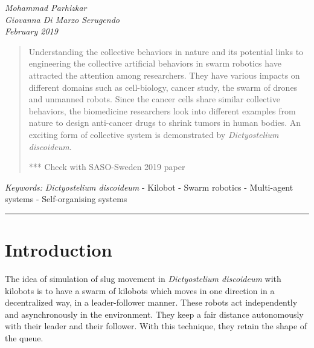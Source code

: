 \documentclass[11pt,a4paper]{article}
\begin{document}
\begin{center}
{ }
\vspace{2mm}

{\selectfont\textit{Mohammad Parhizkar \\ Giovanna Di Marzo Serugendo \\ \tiny{February 2019} }}


\end{center}
\begin{abstract}
Understanding the collective behaviors in nature and its potential links to engineering the collective artificial behaviors in swarm robotics have attracted the attention among researchers. They have various impacts on different domains such as cell-biology, cancer study, the swarm of drones and unmanned robots. Since the cancer cells share similar collective behaviors, the biomedicine researchers look into different examples from nature to design anti-cancer drugs to shrink tumors in human bodies. An exciting form of collective system is demonstrated by {\textit{Dictyostelium discoideum}}. 

*** Check with SASO-Sweden 2019 paper

   \end{abstract}

{\footnotesize\textit{Keywords:} {\textit{Dictyostelium discoideum}} - Kilobot - Swarm robotics - Multi-agent systems - Self-organising systems}

{\begin{center}\noindent\rule{14cm}{0.4pt}\end{center}}
\section{Introduction}
The idea of simulation of slug movement in \textit{Dictyostelium discoideum} with kilobots is to have a swarm of kilobots which moves in one direction in a decentralized way, in a leader-follower manner. These robots act independently and asynchronously in the environment. They keep a fair distance autonomously with their leader and their follower. With this technique, they retain the shape of the queue.  
\end{document}
